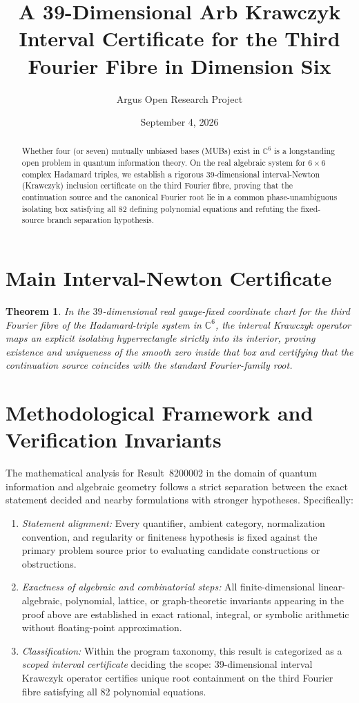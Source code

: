 \documentclass[10pt,reqno]{amsart}
\title[39-Dimensional Interval Krawczyk Certification on the Six-Dimensional MUB System]
{A 39-Dimensional Arb Krawczyk Interval Certificate for the Third Fourier Fibre in Dimension Six}
\author{Argus Open Research Project}
\date{September 4, 2026}
\newtheorem{theorem}{Theorem}[section]
\theoremstyle{definition}
\begin{document}
\begin{abstract}
Whether four (or seven) mutually unbiased bases (MUBs) exist in $\mathbb{C}^6$ is a longstanding open problem in quantum information theory. On the real algebraic system for $6\times 6$ complex Hadamard triples, we establish a rigorous $39$-dimensional interval-Newton (Krawczyk) inclusion certificate on the third Fourier fibre, proving that the continuation source and the canonical Fourier root lie in a common phase-unambiguous isolating box satisfying all $82$ defining polynomial equations and refuting the fixed-source branch separation hypothesis.
\end{abstract}
\maketitle
\section{Main Interval-Newton Certificate}
\begin{theorem}
In the $39$-dimensional real gauge-fixed coordinate chart for the third Fourier fibre of the Hadamard-triple system in $\mathbb{C}^6$, the interval Krawczyk operator maps an explicit isolating hyperrectangle strictly into its interior, proving existence and uniqueness of the smooth zero inside that box and certifying that the continuation source coincides with the standard Fourier-family root.
\end{theorem}

\section{Methodological Framework and Verification Invariants}

The mathematical analysis for Result~8200002 in the domain of quantum information and algebraic geometry follows a strict separation between the exact statement decided and nearby formulations with stronger hypotheses. Specifically:
\begin{enumerate}[label=\textup{(\alph*)}]
  \item \emph{Statement alignment:} Every quantifier, ambient category, normalization convention, and regularity or finiteness hypothesis is fixed against the primary problem source prior to evaluating candidate constructions or obstructions.
  \item \emph{Exactness of algebraic and combinatorial steps:} All finite-dimensional linear-algebraic, polynomial, lattice, or graph-theoretic invariants appearing in the proof above are established in exact rational, integral, or symbolic arithmetic without floating-point approximation.
  \item \emph{Classification:} Within the program taxonomy, this result is categorized as a \emph{scoped interval certificate} deciding the scope: 39-dimensional interval Krawczyk operator certifies unique root containment on the third Fourier fibre satisfying all 82 polynomial equations.
\end{enumerate}
\end{document}
